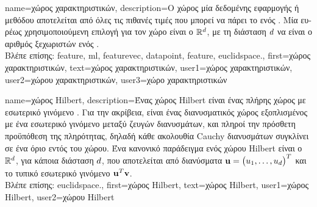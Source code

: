 {name={\foreignlanguage{greek}{χώρος χαρακτηριστικών}},
	description={\foreignlanguage{greek}{Ο χώρος}  
		\foreignlanguage{greek}{μία δεδομένης εφαρμογής ή μεθόδου}  \foreignlanguage{greek}{αποτελείται από 
		όλες τις πιθανές τιμές που μπορεί να πάρει το}  \foreignlanguage{greek}{ενός} . 
		\foreignlanguage{greek}{Μία ευρέως χρησιμοποιούμενη επιλογή για τον χώρο}  
		\foreignlanguage{greek}{είναι ο}  $\mathbb{R}^{d}$, 
		\foreignlanguage{greek}{με τη διάσταση $d$ να είναι ο αριθμός ξεχωριστών}  
		\foreignlanguage{greek}{ενός} .\\
		\foreignlanguage{greek}{Βλέπε επίσης:} \gls{feature}, \gls{ml}, \gls{featurevec}, \gls{datapoint}, \gls{feature}, \gls{euclidspace}.},
	first={\foreignlanguage{greek}{χώρος χαρακτηριστικών}},
	text={\foreignlanguage{greek}{χώρος χαρακτηριστικών}},
	user1={\foreignlanguage{greek}{χώρος χαρακτηριστικών}}, %
  	user2={\foreignlanguage{greek}{χώρου χαρακτηριστικών}}, %
	user3={\foreignlanguage{greek}{χώρο χαρακτηριστικών}} %
}

{name={\foreignlanguage{greek}{χώρος} Hilbert},
	description={\foreignlanguage{greek}{Ένας χώρος} Hilbert \foreignlanguage{greek}{είναι ένας 
		πλήρης χώρος με εσωτερικό γινόμενο} \cite{introhilbertbook}. \foreignlanguage{greek}{Για την ακρίβεια, είναι ένας διανυσματικός χώρος 
		εξοπλισμένος με ένα εσωτερικό γινόμενο μεταξύ ζευγών διανυσμάτων, και πληροί την πρόσθετη προϋπόθεση της πληρότητας, 
		δηλαδή κάθε ακολουθία} Cauchy \foreignlanguage{greek}{διανυσμάτων συγκλίνει σε ένα όριο εντός του χώρου.  
		Ένα κανονικό παράδειγμα ενός χώρου} Hilbert \foreignlanguage{greek}{είναι ο}  $\mathbb{R}^{d}$, 
		\foreignlanguage{greek}{για κάποια διάσταση $d$, που αποτελείται από διανύσματα ${\bf u} = \big(u_1, \ldots, u_{d}\big)^T$ 
		και το τυπικό εσωτερικό γινόμενο} ${\bf u}^T {\bf v}$.\\
		\foreignlanguage{greek}{Βλέπε επίσης:} \gls{euclidspace}.},
	first={\foreignlanguage{greek}{χώρος} Hilbert},
	text={\foreignlanguage{greek}{χώρος} Hilbert},
	user1={\foreignlanguage{greek}{χώρος} Hilbert}, %
	user2={\foreignlanguage{greek}{χώρου} Hilbert} %
}

